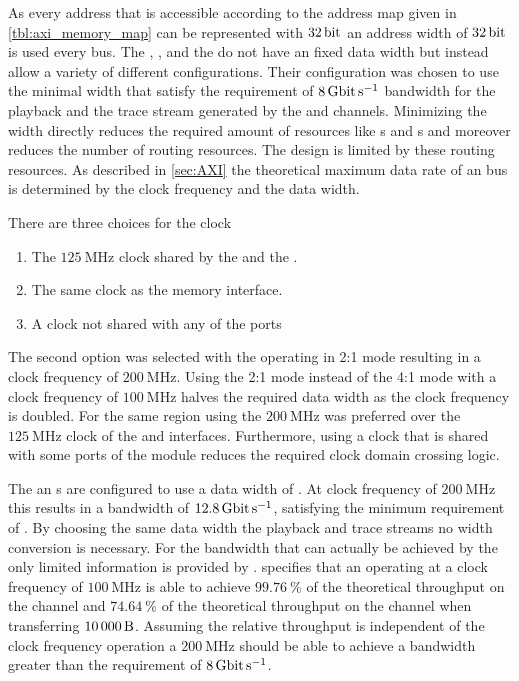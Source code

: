 As every address that is accessible according to the address map given in \autoref{tbl:axi_memory_map} can be represented with $\SI{32}{\bit}$ an address width of $\SI{32}{\bit}$ is used every \AXI{} bus.
The \AXIDMA{}, \XilinxMIG{}, \smartconnect{} and the \AXIBRAMController{} do not have an fixed \AXI{} data width but instead allow a variety of different configurations.
Their configuration was chosen to use the minimal width that satisfy the requirement of $\pbExecBandwidth{}$ bandwidth for the playback and the trace stream generated by the \MMToS{} and \SToMM{} channels. Minimizing the width directly reduces the required amount of \FPGA{} resources like \LUT{}s and \FF{}s and moreover reduces the number of routing resources. The \FPGA{} design is limited by these routing resources\autocite{ref:fpga_routing_limited}.
As described in \autoref{sec:AXI} the theoretical maximum data rate of an \AXI{} bus is determined by the clock frequency and the data width.

There are three choices for the clock
\begin{enumerate}
    \item The $\SI{125}{\mega\hertz}$ clock shared by the \HostARQ{} and the \pbexec{}.
    \item The same clock as the \XilinxMIG{} memory interface.
    \item A clock not shared with any of the ports
\end{enumerate}
The second option was selected with the \XilinxMIG{} operating in 2:1 mode resulting in a clock frequency of $\SI{200}{\mega\hertz}$. Using the 2:1 mode instead of the 4:1 mode with a clock frequency of $\SI{100}{\mega\hertz}$ halves the required data width as the clock frequency is doubled. For the same region using the $\SI{200}{\mega\hertz}$ was preferred over the $\SI{125}{\mega\hertz}$ clock of the \HostARQ{} and \pbexec{} interfaces.
Furthermore, using a clock that is shared with some ports of the module reduces the required clock domain crossing logic.

The \SToMM{} an \MMToS{} \AXIStream{}s are configured to use a data width of \PhyWordSize{}. At clock frequency of $\SI{200}{\mega\hertz}$ this results in a bandwidth of $\SI{12.8}{\giga\bit\per\second}$, satisfying the minimum requirement of \pbExecBandwidth{}. By choosing the same data width the \pbexec{} playback and trace streams no width conversion is necessary. For the bandwidth that can actually be achieved by the \AXIDMA{} only limited information is provided by \Xilinx{}. \Xilinx{} specifies that an \AXIDMA{} operating at a clock frequency of $\SI{100}{\mega\hertz}$ is able to achieve $\SI{99.76}{\percent}$ of the theoretical throughput on the \MMToS{} channel and $\SI{74.64}{\percent}$ of the theoretical throughput on the \SToMM{} channel when transferring $\SI{10000}{\byte}$\autocite{ref:axidma}. Assuming the relative throughput is independent of the clock frequency operation a $\SI{200}{\mega\hertz}$ should be able to achieve a bandwidth greater than the requirement of $\pbExecBandwidth{}$.

